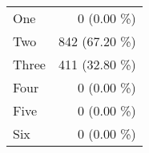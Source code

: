 \begin{tabular}{ l  r }
One & 0 (0.00 \%)\\
Two & 842 (67.20 \%)\\
Three & 411 (32.80 \%)\\
Four & 0 (0.00 \%)\\
Five & 0 (0.00 \%)\\
Six & 0 (0.00 \%)\\
\end{tabular}
